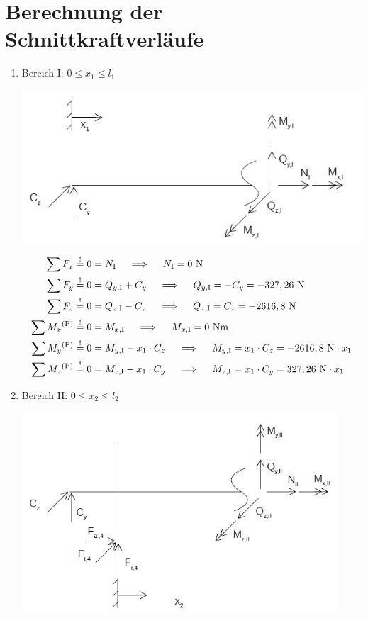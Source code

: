 \section{Berechnung der Schnittkraftverläufe}
\renewcommand{\labelenumi}{\roman{enumi})}
\begin{enumerate}
\item Bereich I: $0 \leq x_1 \leq l_1$
\begin{center}
	\includegraphics[width=1.04\textwidth,keepaspectratio]{figures/Bereich1.png}
\end{center}
    \begin{align*}
        \sum F_x &\overset{!}{=} 0 = N_{\mathrm{I}} \quad \implies \quad  N_{\mathrm{I}} = 0 \text{ N}\\ 
        \sum F_y &\overset{!}{=} 0 =  Q_{y,\mathrm{I}} + C_y \quad \implies \quad  Q_{y,\mathrm{I}} = -C_y = -327,26\text{ N}\\
        \sum F_z &\overset{!}{=} 0 =  Q_{z,\mathrm{I}} - C_z \quad \implies \quad  Q_{z,\mathrm{I}} = C_z = -2616,8\text{ N}\\
        \sum M_x \textsuperscript{(P)}&\overset{!}{=} 0 = M_{x,\mathrm{I}} \quad \implies \quad   M_{x,\mathrm{I}} = 0 \text{ Nm} \\ 
        \sum M_y \textsuperscript{(P)}&\overset{!}{=} 0 = M_{y,\mathrm{I}} - x_1 \cdot C_z \quad \implies \quad   M_{y,\mathrm{I}} =x_1 \cdot C_z =-2616,8 \text{ N} \cdot x_1\\ 
        \sum M_z \textsuperscript{(P)}&\overset{!}{=} 0 = M_{z,\mathrm{I}} -x_1 \cdot C_y  \quad \implies \quad   M_{z,\mathrm{I}} = x_1 \cdot C_y = 327,26\text{ N} \cdot x_1 \\ 
    \end{align*}
\newpage
\item Bereich II: $0 \leq x_2 \leq l_2$
\begin{center}
	\includegraphics[width=0.93\textwidth,keepaspectratio]{figures/Bereich2.png}

\end{center}
\end{enumerate}
